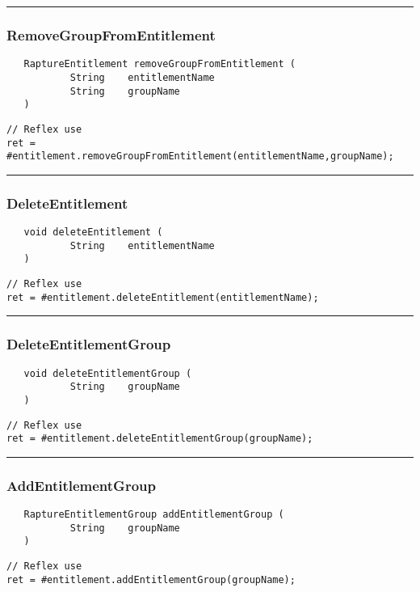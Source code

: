 \rule{15cm}{2pt}
\subsubsection{RemoveGroupFromEntitlement}
\label{Api:RemoveGroupFromEntitlement}
\begin{verbatim}
   RaptureEntitlement removeGroupFromEntitlement (
           String    entitlementName
           String    groupName
   )
\end{verbatim}
\begin{lstlisting}[language=reflex]
// Reflex use
ret = #entitlement.removeGroupFromEntitlement(entitlementName,groupName);
\end{lstlisting}



\rule{15cm}{2pt}
\subsubsection{DeleteEntitlement}
\label{Api:DeleteEntitlement}
\begin{verbatim}
   void deleteEntitlement (
           String    entitlementName
   )
\end{verbatim}
\begin{lstlisting}[language=reflex]
// Reflex use
ret = #entitlement.deleteEntitlement(entitlementName);
\end{lstlisting}



\rule{15cm}{2pt}
\subsubsection{DeleteEntitlementGroup}
\label{Api:DeleteEntitlementGroup}
\begin{verbatim}
   void deleteEntitlementGroup (
           String    groupName
   )
\end{verbatim}
\begin{lstlisting}[language=reflex]
// Reflex use
ret = #entitlement.deleteEntitlementGroup(groupName);
\end{lstlisting}



\rule{15cm}{2pt}
\subsubsection{AddEntitlementGroup}
\label{Api:AddEntitlementGroup}
\begin{verbatim}
   RaptureEntitlementGroup addEntitlementGroup (
           String    groupName
   )
\end{verbatim}
\begin{lstlisting}[language=reflex]
// Reflex use
ret = #entitlement.addEntitlementGroup(groupName);
\end{lstlisting}



